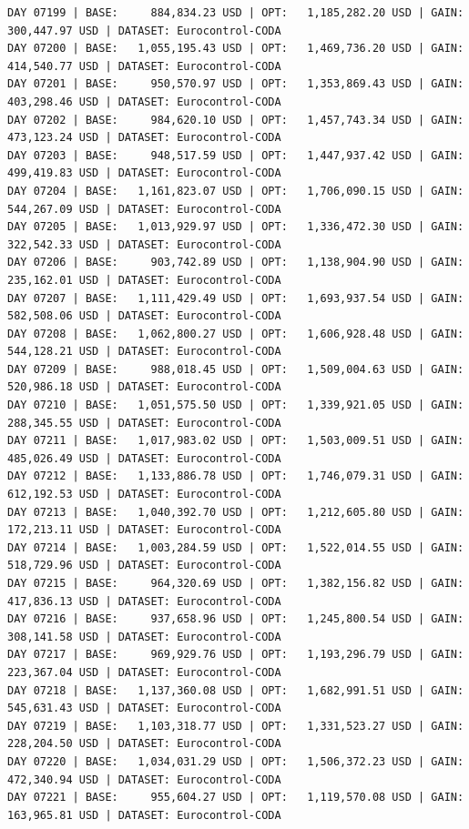 \documentclass[11pt,a4paper]{article}
\begin{document}
\begin{verbatim}
DAY 07199 | BASE:     884,834.23 USD | OPT:   1,185,282.20 USD | GAIN: 300,447.97 USD | DATASET: Eurocontrol-CODA
DAY 07200 | BASE:   1,055,195.43 USD | OPT:   1,469,736.20 USD | GAIN: 414,540.77 USD | DATASET: Eurocontrol-CODA
DAY 07201 | BASE:     950,570.97 USD | OPT:   1,353,869.43 USD | GAIN: 403,298.46 USD | DATASET: Eurocontrol-CODA
DAY 07202 | BASE:     984,620.10 USD | OPT:   1,457,743.34 USD | GAIN: 473,123.24 USD | DATASET: Eurocontrol-CODA
DAY 07203 | BASE:     948,517.59 USD | OPT:   1,447,937.42 USD | GAIN: 499,419.83 USD | DATASET: Eurocontrol-CODA
DAY 07204 | BASE:   1,161,823.07 USD | OPT:   1,706,090.15 USD | GAIN: 544,267.09 USD | DATASET: Eurocontrol-CODA
DAY 07205 | BASE:   1,013,929.97 USD | OPT:   1,336,472.30 USD | GAIN: 322,542.33 USD | DATASET: Eurocontrol-CODA
DAY 07206 | BASE:     903,742.89 USD | OPT:   1,138,904.90 USD | GAIN: 235,162.01 USD | DATASET: Eurocontrol-CODA
DAY 07207 | BASE:   1,111,429.49 USD | OPT:   1,693,937.54 USD | GAIN: 582,508.06 USD | DATASET: Eurocontrol-CODA
DAY 07208 | BASE:   1,062,800.27 USD | OPT:   1,606,928.48 USD | GAIN: 544,128.21 USD | DATASET: Eurocontrol-CODA
DAY 07209 | BASE:     988,018.45 USD | OPT:   1,509,004.63 USD | GAIN: 520,986.18 USD | DATASET: Eurocontrol-CODA
DAY 07210 | BASE:   1,051,575.50 USD | OPT:   1,339,921.05 USD | GAIN: 288,345.55 USD | DATASET: Eurocontrol-CODA
DAY 07211 | BASE:   1,017,983.02 USD | OPT:   1,503,009.51 USD | GAIN: 485,026.49 USD | DATASET: Eurocontrol-CODA
DAY 07212 | BASE:   1,133,886.78 USD | OPT:   1,746,079.31 USD | GAIN: 612,192.53 USD | DATASET: Eurocontrol-CODA
DAY 07213 | BASE:   1,040,392.70 USD | OPT:   1,212,605.80 USD | GAIN: 172,213.11 USD | DATASET: Eurocontrol-CODA
DAY 07214 | BASE:   1,003,284.59 USD | OPT:   1,522,014.55 USD | GAIN: 518,729.96 USD | DATASET: Eurocontrol-CODA
DAY 07215 | BASE:     964,320.69 USD | OPT:   1,382,156.82 USD | GAIN: 417,836.13 USD | DATASET: Eurocontrol-CODA
DAY 07216 | BASE:     937,658.96 USD | OPT:   1,245,800.54 USD | GAIN: 308,141.58 USD | DATASET: Eurocontrol-CODA
DAY 07217 | BASE:     969,929.76 USD | OPT:   1,193,296.79 USD | GAIN: 223,367.04 USD | DATASET: Eurocontrol-CODA
DAY 07218 | BASE:   1,137,360.08 USD | OPT:   1,682,991.51 USD | GAIN: 545,631.43 USD | DATASET: Eurocontrol-CODA
DAY 07219 | BASE:   1,103,318.77 USD | OPT:   1,331,523.27 USD | GAIN: 228,204.50 USD | DATASET: Eurocontrol-CODA
DAY 07220 | BASE:   1,034,031.29 USD | OPT:   1,506,372.23 USD | GAIN: 472,340.94 USD | DATASET: Eurocontrol-CODA
DAY 07221 | BASE:     955,604.27 USD | OPT:   1,119,570.08 USD | GAIN: 163,965.81 USD | DATASET: Eurocontrol-CODA

\end{verbatim}
\end{document}
